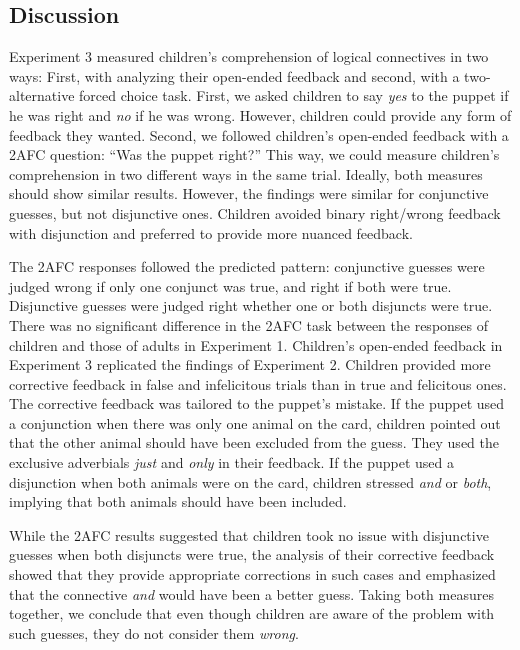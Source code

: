 \documentclass[,man,floatsintext]{apa6}
\begin{document}
\hypertarget{discussion-2}{%
\subsection{Discussion}\label{discussion-2}}

Experiment 3 measured children's comprehension of logical connectives in two ways: First, with analyzing their open-ended feedback and second, with a two-alternative forced choice task. First, we asked children to say \emph{yes} to the puppet if he was right and \emph{no} if he was wrong. However, children could provide any form of feedback they wanted. Second, we followed children's open-ended feedback with a 2AFC question: \enquote{Was the puppet right?} This way, we could measure children's comprehension in two different ways in the same trial. Ideally, both measures should show similar results. However, the findings were similar for conjunctive guesses, but not disjunctive ones. Children avoided binary right/wrong feedback with disjunction and preferred to provide more nuanced feedback.

The 2AFC responses followed the predicted pattern: conjunctive guesses were judged wrong if only one conjunct was true, and right if both were true. Disjunctive guesses were judged right whether one or both disjuncts were true. There was no significant difference in the 2AFC task between the responses of children and those of adults in Experiment 1. Children's open-ended feedback in Experiment 3 replicated the findings of Experiment 2. Children provided more corrective feedback in false and infelicitous trials than in true and felicitous ones. The corrective feedback was tailored to the puppet's mistake. If the puppet used a conjunction when there was only one animal on the card, children pointed out that the other animal should have been excluded from the guess. They used the exclusive adverbials \emph{just} and \emph{only} in their feedback. If the puppet used a disjunction when both animals were on the card, children stressed \emph{and} or \emph{both}, implying that both animals should have been included.

While the 2AFC results suggested that children took no issue with disjunctive guesses when both disjuncts were true, the analysis of their corrective feedback showed that they provide appropriate corrections in such cases and emphasized that the connective \emph{and} would have been a better guess. Taking both measures together, we conclude that even though children are aware of the problem with such guesses, they do not consider them \emph{wrong}.
\end{document}
